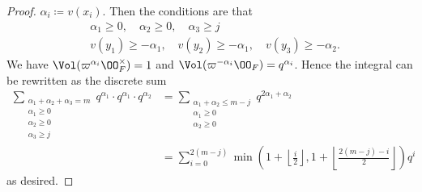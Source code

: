 \begin{proof}
  $\alpha_i \coloneqq v(x_i)$.
  Then the conditions are that
  \begin{align*}
    &\alpha_1 \ge 0, \quad \alpha_2 \ge 0, \quad \alpha_3 \ge j \\
    &v(y_1) \ge - \alpha_1, \quad v(y_2) \ge - \alpha_1, \quad v(y_3) \ge -\alpha_2.
  \end{align*}
  We have $\Vol(\varpi^{\alpha_i} \OO_F^\times) = 1$
  and $\Vol(\varpi^{-\alpha_i} \OO_F) = q^{\alpha_i}$.
  Hence the integral can be rewritten as the discrete sum
  \begin{align*}
    \sum_{\substack{\alpha_1 + \alpha_2 + \alpha_3 = m \\ \alpha_1 \ge 0 \\ \alpha_2 \ge 0 \\ \alpha_3 \ge j}}
    q^{\alpha_1} \cdot q^{\alpha_1} \cdot q^{\alpha_2}
    &= \sum_{\substack{\alpha_1 + \alpha_2 \le m-j \\ \alpha_1 \ge 0 \\ \alpha_2 \ge 0}}
    q^{2\alpha_1+\alpha_2} \\
    &= \sum_{i=0}^{2(m-j)}
    \min \left( 1 + \left\lfloor \frac i2 \right\rfloor,
      1 + \left\lfloor \frac{2(m-j)-i}{2} \right\rfloor
    \right) q^i
  \end{align*}
  as desired.
\end{proof}

